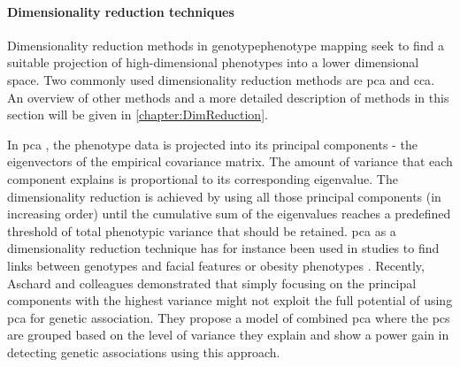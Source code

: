 \paragraph{Dimensionality reduction techniques} Dimensionality reduction methods in genotype\-phenotype mapping seek to find a suitable projection of high-dimensional phenotypes into a lower dimensional space. Two  commonly used dimensionality reduction methods are \gls{pca}  and \gls{cca}. An overview of other methods and a more detailed description of methods in this section will be given in \cref{chapter:DimReduction}. 

In \gls{pca} , the phenotype data is projected into its principal components - the eigenvectors of the empirical covariance matrix. The amount of variance that each component explains is proportional to its corresponding eigenvalue. The dimensionality reduction is achieved by using all those principal components (in increasing order) until the cumulative sum of the eigenvalues reaches a predefined threshold of total phenotypic variance that should be retained. \gls{pca}  as a dimensionality reduction technique has for instance been used in studies to find links between genotypes and facial features or obesity phenotypes \citep{Liu2012,Claes2014,He2008}. Recently, Aschard and colleagues \citep{Aschard2014} demonstrated that simply focusing on the principal components with the highest variance might not exploit the full potential of using \gls{pca}  for genetic association. They propose a model of combined \gls{pca} where the \glspl{pc} are grouped based on the level of variance they explain and show a power gain in detecting genetic associations using this approach.

